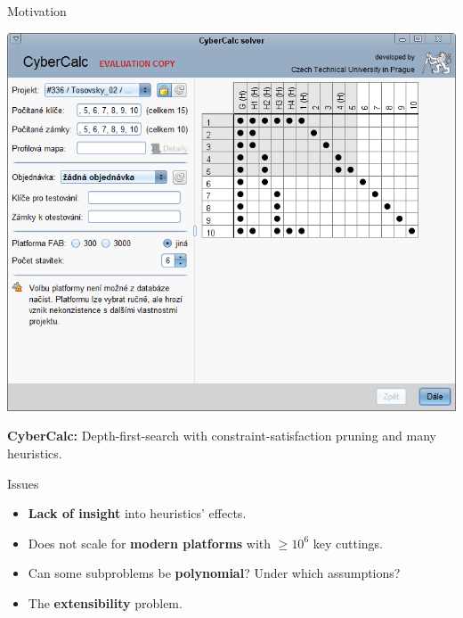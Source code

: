 \begin{frame}{Motivation}
  \begin{minipage}[t][180pt][t]{.40\textwidth}
    \bigskip

    \includegraphics[width=\textwidth]{Extension.png}
  \end{minipage}
  \pause
  \hfill
  \begin{minipage}[t][180pt][t]{.55\textwidth}
    \textbf{CyberCalc:} Depth-first-search with
    constraint-satisfaction pruning 
    and many heuristics.

    \pause

    \begin{block}{Issues}
      \begin{itemize}
        \item \textbf{Lack of insight} into heuristics' effects.
        \item Does not scale for \textbf{modern platforms} with $\geq 10^6$ key cuttings. 
        \item Can some subproblems be \textbf{polynomial}? Under which assumptions?
        \item The \textbf{extensibility} problem.
      \end{itemize}
    \end{block}
  \end{minipage}
\end{frame}


